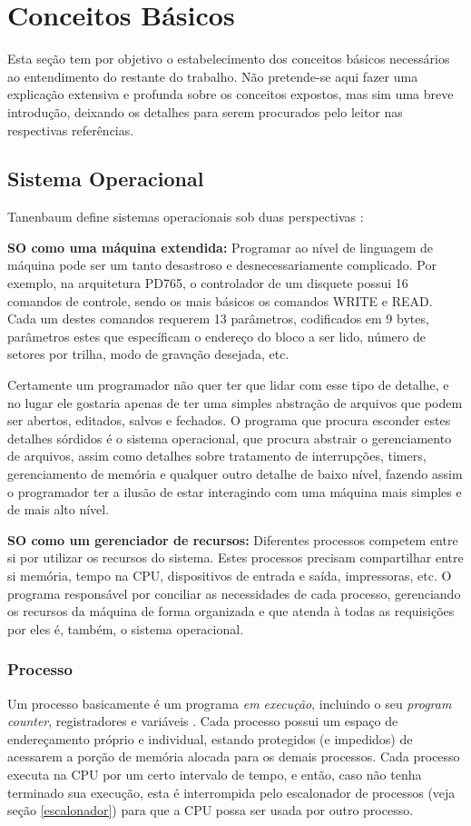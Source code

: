 \chapter{Conceitos Básicos}

Esta seção tem por objetivo o estabelecimento dos conceitos básicos necessários ao entendimento do restante do trabalho. Não pretende-se aqui fazer uma explicação extensiva e profunda sobre os conceitos expostos, mas sim uma breve introdução, deixando os detalhes para serem procurados pelo leitor nas respectivas referências.

\section{Sistema Operacional}
Tanenbaum define sistemas operacionais sob duas perspectivas \cite{tanenbaum}:

\textbf{SO como uma máquina extendida:}
Programar ao nível de linguagem de máquina pode ser um tanto desastroso e desnecessariamente complicado. Por exemplo, na arquitetura PD765, o controlador de um disquete possui 16 comandos de controle, sendo os mais básicos os comandos WRITE e READ. Cada um destes comandos requerem 13 parâmetros, codificados em 9 bytes, parâmetros estes que específicam o endereço do bloco a ser lido, número de setores por trilha, modo de gravação desejada, etc.

Certamente um programador não quer ter que lidar com esse tipo de detalhe, e no lugar ele gostaria apenas de ter uma simples abstração de arquivos que podem ser abertos, editados, salvos e fechados.
O programa que procura esconder estes detalhes sórdidos é o sistema operacional, que procura abstrair o gerenciamento de arquivos, assim como detalhes sobre tratamento de interrupções, timers, gerenciamento de memória e qualquer outro detalhe de baixo nível, fazendo assim o programador ter a ilusão de estar interagindo com uma máquina mais simples e de mais alto nível.

\textbf{SO como um gerenciador de recursos:}
Diferentes processos competem entre si por utilizar os recursos do sistema. Estes processos precisam compartilhar entre si memória, tempo na CPU, dispositivos de entrada e saída, impressoras, etc. O programa responsável por conciliar as necessidades de cada processo, gerenciando os recursos da máquina de forma organizada e que atenda à todas as requisições por eles é, também, o sistema operacional.

\subsection{Processo}
Um processo basicamente é um programa \emph{em execução}, incluindo o seu \emph{program counter}, registradores e variáveis \cite{tanenbaum}. Cada processo possui um espaço de endereçamento próprio e individual, estando protegidos (e impedidos) de acessarem a porção de memória alocada para os demais processos. Cada processo executa na CPU por um certo intervalo de tempo, e então, caso não tenha terminado sua execução, esta é interrompida pelo escalonador de processos (veja seção \ref{escalonador}) para que a CPU possa ser usada por outro processo.

